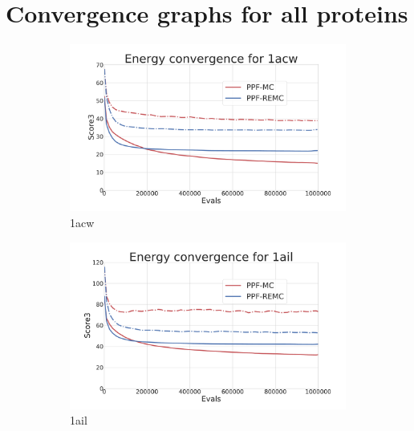 \chapter{Convergence graphs for all proteins}\label{appendix:convergence-plots}

\begin{figure}[ht]
  \begin{subfigure}{0.7\linewidth}
    \centering
    \includegraphics[width=1\linewidth]{Figuras/plots/energy_convergence/energy_convergence_1acw.pdf}
    \caption{1acw}
  \end{subfigure}
%
  \begin{subfigure}{0.7\linewidth}
    \centering
    \includegraphics[width=1\linewidth]{Figuras/plots/energy_convergence/energy_convergence_1ail.pdf}
    \caption{1ail}
  \end{subfigure}
%
  \begin{subfigure}{0.7\linewidth}
    \centering

\end{subfigure}
\end{figure}
